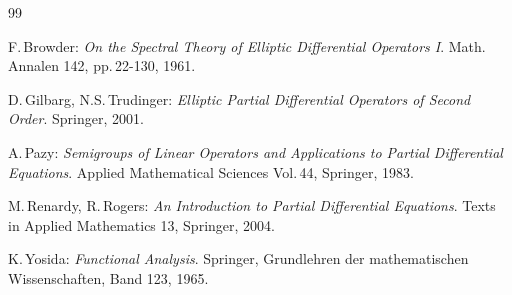 \documentclass[11pt,twoside]{article}
\begin{document}
\vspace{5mm}
\begin{thebibliography}{99}
\begin{small}

 F.\,Browder:
\textit{On the Spectral Theory of Elliptic Differential Operators I}.
Math. Annalen 142, pp.\,22-130, 1961.

  D.\,Gilbarg, N.S.\,Trudinger:
\textit{Elliptic Partial Differential Operators of Second Order}.
Springer, 2001.

 A.\,Pazy:
\textit{Semigroups of Linear Operators
        and Applications to Partial Differential Equations}.
Applied Mathematical Sciences Vol.\,44, Springer, 1983.

 M.\,Renardy, R.\,Rogers:
\textit{An Introduction to Partial Differential Equations}.
Texts in Applied Mathematics 13, Springer, 2004.

 K.\,Yosida:
\textit{Functional Analysis}.
Springer, Grund\-lehren der mathematischen Wissenschaften, Band 123, 1965.

\end{small}
\end{thebibliography}

\end{document}
